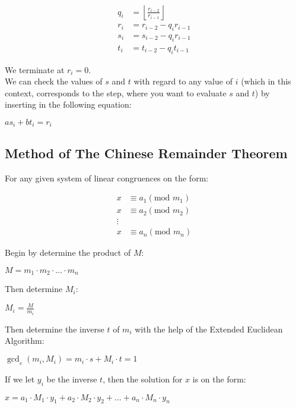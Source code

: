 \documentclass{report}
\newcommand{\cent}[1]{\begin{center}#1\end{center}}
\newcommand{\mAlign}[1]{\begin{align*}#1\end{align*}}
\newcommand{\Floor}[1]{\left \lfloor{#1}\right \rfloor }
\begin{document}
	\mAlign{q_i &= \Floor{\frac{r_{i-2}}{r_{i-1}}} \\
				  r_i &= r_{i-2} - q_i r_{i-1} \\
			  	  s_i &= s_{i-2} - q_i r_{i-1} \\
		  	  	  t_i &= t_{i-2} - q_i t_{i-1}}
	
	We terminate at $r_i = 0$.\\
	
	We can check the values of $s$ and $t$ with regard to any value of $i$ (which in this context, corresponds to the step, where you want to evaluate $s$ and $t$) by inserting in the following equation:
	
	\cent{$as_i+bt_i=r_i$}
	\subsection{Method of The Chinese Remainder Theorem}
	
	For any given system of linear congruences on the form:
	
	\mAlign{x &\equiv a_1 (\text{mod } m_1)\\
				 x &\equiv a_2(\text{mod } m_2) \\
			 	 \vdots \\
		 	  	 x &\equiv a_n(\text{mod } m_n)}
	 
	Begin by determine the product of $M$:
	 
	\cent{$M = m_1 \cdot m_2 \cdot \hdots \cdot m_n $}
	 
	Then determine $M_i$:
	
	\cent{$M_i = \frac{M}{m_i}$}
	
	Then determine the inverse $t$ of $m_i$ with the help of the Extended Euclidean Algorithm:
	
	\cent{$\gcd_e(m_i,M_i) =m_i \cdot s + M_i \cdot t= 1$}
	
	If we let $y_i$ be the inverse $t$, then the solution for $x$ is on the form:
	 
	\cent{$x = a_1\cdot M_1 \cdot y_1 + a_2\cdot M_2 \cdot y_2 + \hdots + a_n\cdot M_n \cdot y_n  $}
	
	
\end{document}
